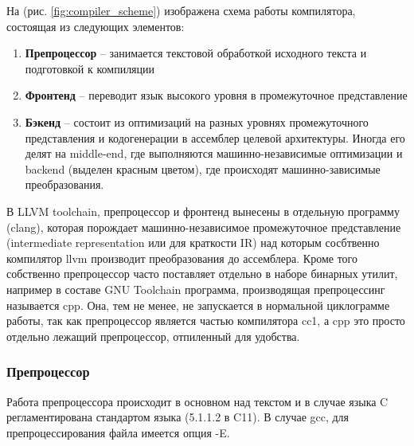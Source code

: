 \documentclass[a4paper,12pt,oneside]{article}
\begin{document}
На (рис. \ref{fig:compiler_scheme}) изображена схема работы компилятора, состоящая из следующих элементов:

\begin{enumerate}
\item \textbf{Препроцессор} -- занимается текстовой обработкой исходного текста и подготовкой к компиляции
\item \textbf{Фронтенд} -- переводит язык высокого уровня в промежуточное представление
\item \textbf{Бэкенд} -- состоит из оптимизаций на разных уровнях промежуточного представления и кодогенерации в ассемблер целевой архитектуры. Иногда его делят на middle-end, где выполняются машинно-независимые оптимизации и backend (выделен красным цветом), где происходят машинно-зависимые преобразования.
\end{enumerate}

В LLVM toolchain, препроцессор и фронтенд вынесены в отдельную программу (clang), которая порождает машинно-независимое промежуточное представление (intermediate representation или для краткости IR) над которым сосбтвенно компилятор llvm производит преобразования до ассемблера. Кроме того собственно препроцессор часто поставляет отдельно в наборе бинарных утилит, например в составе GNU Toolchain программа, производящая препроцессинг называется cpp. Она, тем не менее, не запускается в нормальной циклограмме работы, так как препроцессор является частью компилятора cc1, а cpp это просто отдельно лежащий препроцессор, отпиленный для удобства.

\subsubsection{Препроцессор}

Работа препроцессора происходит в основном над текстом и в случае языка C регламентирована стандартом языка (5.1.1.2 в C11). В случае gcc, для препроцессирования файла имеется опция -E.
\end{document}
